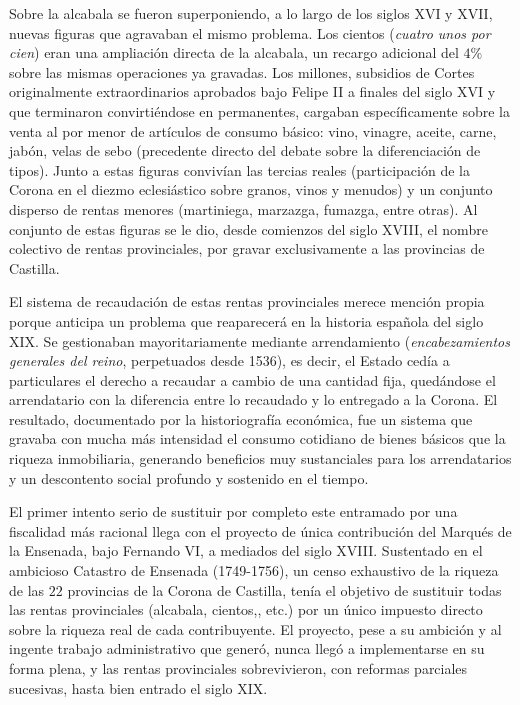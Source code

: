 \documentclass[10pt,a4paper]{article}
\begin{document}
Sobre la alcabala se fueron superponiendo, a lo largo de los siglos XVI y XVII, nuevas figuras que agravaban el mismo problema. Los cientos (\textit{cuatro unos por cien}) eran una ampliación directa de la alcabala, un recargo adicional del $4\%$ sobre las mismas operaciones ya gravadas. Los millones, subsidios de Cortes originalmente extraordinarios aprobados bajo Felipe II a finales del siglo XVI y que terminaron convirtiéndose en permanentes, cargaban específicamente sobre la venta al por menor de artículos de consumo básico: vino, vinagre, aceite, carne, jabón, velas de sebo (precedente directo del debate sobre la diferenciación de tipos). Junto a estas figuras convivían las tercias reales (participación de la Corona en el diezmo eclesiástico sobre granos, vinos y menudos) y un conjunto disperso de rentas menores (martiniega, marzazga, fumazga, entre otras). Al conjunto de estas figuras se le dio, desde comienzos del siglo XVIII, el nombre colectivo de rentas provinciales, por gravar exclusivamente a las provincias de Castilla.

El sistema de recaudación de estas rentas provinciales merece mención propia porque anticipa un problema que reaparecerá en la historia española del siglo XIX. Se gestionaban mayoritariamente mediante arrendamiento (\textit{encabezamientos generales del reino}, perpetuados desde 1536), es decir, el Estado cedía a particulares el derecho a recaudar a cambio de una cantidad fija, quedándose el arrendatario con la diferencia entre lo recaudado y lo entregado a la Corona. El resultado, documentado por la historiografía económica, fue un sistema que gravaba con mucha más intensidad el consumo cotidiano de bienes básicos que la riqueza inmobiliaria, generando beneficios muy sustanciales para los arrendatarios y un descontento social profundo y sostenido en el tiempo.

El primer intento serio de sustituir por completo este entramado por una fiscalidad más racional llega con el proyecto de única contribución del Marqués de la Ensenada, bajo Fernando VI, a mediados del siglo XVIII. Sustentado en el ambicioso Catastro de Ensenada (1749-1756), un censo exhaustivo de la riqueza de las $22$ provincias de la Corona de Castilla, tenía el objetivo de sustituir todas las rentas provinciales (alcabala, cientos,, etc.) por un único impuesto directo sobre la riqueza real de cada contribuyente. El proyecto, pese a su ambición y al ingente trabajo administrativo que generó, nunca llegó a implementarse en su forma plena, y las rentas provinciales sobrevivieron, con reformas parciales sucesivas, hasta bien entrado el siglo XIX.
\end{document}
